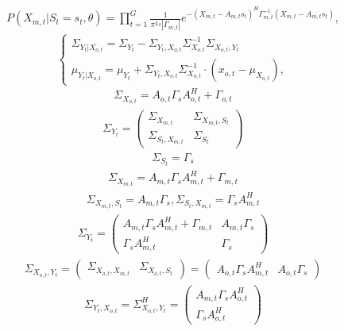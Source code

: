 \documentclass[11pt]{article}
\begin{document}
\begin{gather}
P(X_{m,t}|S_t=s_t,\theta) = \prod_{t=1}^G \frac{1}{\pi^{L_2} |\Gamma_{m,t}|}e^{-(X_{m,t}-A_{m,t} s_t)^H \Gamma_{m,t}^{-1}(X_{m,t}-A_{m,t} s_t)},
\end{gather}
\begin{equation}
\left\{ \begin{gathered} 
\Sigma_{Y_t|X_{o,t}} = \Sigma_{Y_t}-\Sigma_{Y_t,X_{o,t}}\Sigma_{X_{o,t}}^{-1}\Sigma_{X_{o,t},Y_t} \\
\mu_{Y_t|X_{o,t}} = \mu_{Y_t} + \Sigma_{Y_t,X_{o,t}}\Sigma_{X_{o,t}}^{-1}\cdot(x_{o,t}-\mu_{X_{o,t}}),
\end{gathered} \right.
\end{equation}
\begin{gather}
\Sigma_{X_{o,t}}=A_{o,t}\Gamma_sA_{o,t}^H+\Gamma_{o,t}
\end{gather}
\begin{gather}
\Sigma_{Y_t} = \begin{pmatrix}
\Sigma_{X_{m,t}}&\Sigma_{X_{m,t}, S_t}\\
\Sigma_{S_t, X_{m,t}}&\Sigma_{S_t}
\end{pmatrix}
\end{gather}
\begin{gather}
\Sigma_{S_t} = \Gamma_s
\end{gather}
\begin{gather}
\Sigma_{X_{m,t}} = A_{m,t} \Gamma_s A_{m,t}^H + \Gamma_{m,t}
\end{gather}
\begin{gather}
\Sigma_{X_{m,t},S_t} = A_{m,t} \Gamma_s, \Sigma_{S_t, X_{m,t}} = \Gamma_s A_{m,t}^H 
\end{gather}
\begin{gather}
\Sigma_{Y_t} = \begin{pmatrix}
A_{m,t} \Gamma_s A_{m,t}^H + \Gamma_{m,t}&A_{m,t} \Gamma_s\\
\Gamma_s A_{m,t}^H&\Gamma_s
\end{pmatrix}
\end{gather}
\begin{gather}
\Sigma_{X_{o,t},Y_t}
= \begin{pmatrix}
\Sigma_{X_{o,t},X_{m,t}}&\Sigma_{X_{o,t},S_t}
\end{pmatrix}= 
\begin{pmatrix}
A_{o,t}\Gamma_s A_{m,t}^H&A_{o,t}\Gamma_s
\end{pmatrix}
\end{gather}
\begin{gather}
\Sigma_{Y_t,X_{o,t}}
= \Sigma_{X_{o,t},Y_t}^H =  \begin{pmatrix}
A_{m,t}\Gamma_s A_{o,t}^H\\
\Gamma_s A_{o,t}^H
\end{pmatrix}
\end{gather}
\end{document}
